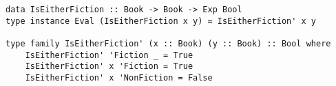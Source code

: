 \documentclass[12pt, a4paper, bibliography=totocnumbered]{scrreprt}
\newcommand{\inline}[1]{\lstinline[basicstyle=\ttfamily\footnotesize]{#1}}
\begin{document}
\begin{lstlisting}
data IsEitherFiction :: Book -> Book -> Exp Bool
type instance Eval (IsEitherFiction x y) = IsEitherFiction' x y

type family IsEitherFiction' (x :: Book) (y :: Book) :: Bool where
    IsEitherFiction' 'Fiction _ = True
    IsEitherFiction' x 'Fiction = True
    IsEitherFiction' x 'NonFiction = False
\end{lstlisting}









\end{document}
